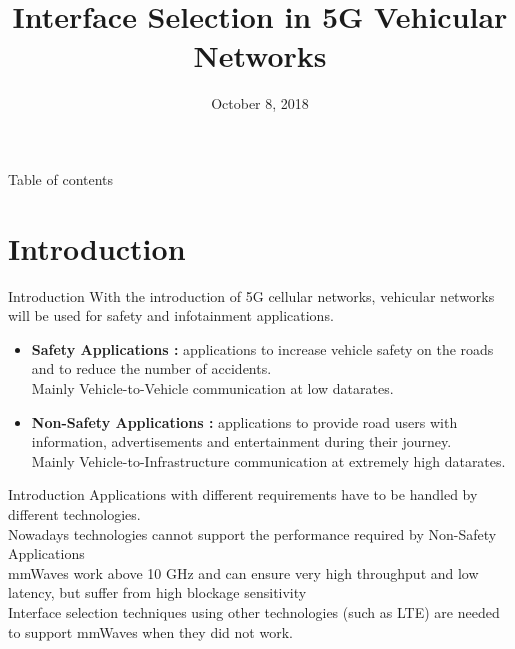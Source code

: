 \documentclass{beamer}
\title{Interface Selection in 5G Vehicular Networks}
\author[Davide Peron]{\usebox{\authbox} \vspace{1cm}}
\date{\small October 8, 2018}
\institute[Unimib]{Università degli studi di Padova}
\begin{document}
	\maketitle

	\begin{frame}{Table of contents}
		\tableofcontents
	\end{frame}


	\section{Introduction}

	\begin{frame}{Introduction}
		With the introduction of 5G cellular networks, vehicular networks will be used for safety and infotainment applications. \vspace{.5em}

		\begin{itemize}
			\item \textbf{Safety Applications : } applications to increase vehicle safety on the roads and to reduce the number of accidents. \\ Mainly Vehicle-to-Vehicle communication at low datarates.
			\item \textbf{Non-Safety Applications : } applications to provide road users with information, advertisements and entertainment during their journey. \\ Mainly Vehicle-to-Infrastructure communication at extremely high datarates.
		\end{itemize}
	\end{frame}

	\begin{frame}{Introduction}
		Applications with different requirements have to be handled by different technologies.\\ \vspace{.5em}
		Nowadays technologies cannot support the performance required by Non-Safety Applications\\ \vspace{.5em}
		mmWaves work above 10 GHz and can ensure very high throughput and low latency, but suffer from high blockage sensitivity \\ \vspace{.5em}
		Interface selection techniques using other technologies (such as LTE) are needed to support mmWaves when they did not work.
	\end{frame}
\end{document}
